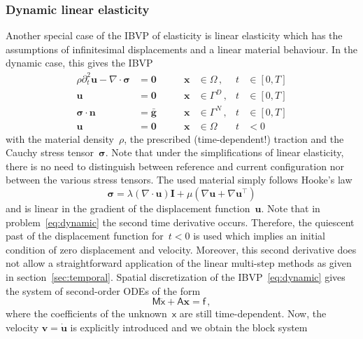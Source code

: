 \documentclass[a4paper,DIV=12,10pt]{scrartcl}
\newcommand{\vek}[1]{\boldsymbol{#1}}  %
\newcommand{\mat}[1]{\mathsf{#1}}      %
\newcommand{\x}[0]{\vek{x}}
\newcommand{\U}[0]{\vek{u}}
\newcommand{\V}[0]{\vek{v}}
\newcommand{\N}[0]{\vek{n}}
\begin{document}
\subsubsection{Dynamic linear elasticity}
\label{sec:dynamic}

Another special case of the IBVP of elasticity is linear elasticity
which has the assumptions of infinitesimal displacements and a linear
material behaviour. In the dynamic case, this gives the IBVP
\begin{equation}
  \label{eq:dynamic}
  \begin{aligned}
    \rho \partial^2_t \U
    -\nabla \cdot \vek{\sigma} &= \vek{0} \qquad
    &\x &\in \Omega\,, &t &\in [0,T]\\
    \U &= \vek{0}     &\x &\in \Gamma^D\,, &t &\in [0,T]\\
    \vek{\sigma} \cdot \N &= \bar{\vek{g}}
    &\x &\in \Gamma^N\,, &t &\in [0,T]\\
    \U &= \vek{0} &\x &\in \Omega\, &t &< 0
  \end{aligned}
\end{equation}
with the material density~$\rho$, the prescribed (time-dependent!)
traction and the Cauchy stress tensor~$\vek{\sigma}$. Note that under
the simplifications of linear elasticity, there is no need to
distinguish between reference and current configuration nor between the
various stress tensors. The used material simply follows Hooke's law
\begin{equation}
  \label{eq:hooke}
  \vek{\sigma} = \lambda (\nabla \cdot \U) \vek{I} + \mu (\nabla \U +
  \nabla \U^\top)
\end{equation}
and is linear in the gradient of the displacement function~$\U$.  Note
that in problem~\eqref{eq:dynamic} the second time derivative
occurs. Therefore, the quiescent past of the displacement function
for~$t<0$ is used which implies an initial condition of zero
displacement and velocity. Moreover, this second derivative does not
allow a straightforward application of the linear multi-step methods
as given in section~\ref{sec:temporal}. Spatial discretization of the
IBVP~\eqref{eq:dynamic} gives the system of second-order ODEs of the
form
\begin{equation}
  \label{eq:spring}
  \mat{M} \ddot{\mat{x}} + \mat{A} \mat{\x} = \mat{f}\,,
\end{equation}
where the coefficients of the unknown~$\mat{x}$ are still
time-dependent. Now, the velocity $\V = \dot{\U}$ is explicitly
introduced and we obtain the block system
\end{document}
